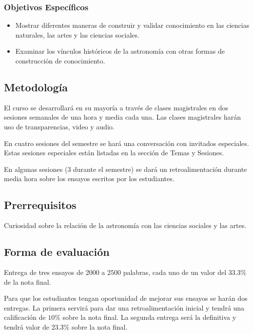 \documentclass[12pt]{report}
\begin{document}
\subsubsection*{Objetivos Espec\'ificos}
\begin{itemize}
\item Mostrar diferentes maneras de construir y validar conocimiento
  en las ciencias naturales, las artes y las ciencias sociales.     

\item Examinar los v\'inculos hist\'oricos de la
  astronom\'ia con otras formas de construcci\'on de conocimiento. 
\end{itemize}

\subsection*{Metodolog\'ia}

El curso se desarrollar\'a en su mayor\'ia a trav\'es de clases
magistrales en dos sesiones semanales de una hora y media cada
una. 
Las clases magistrales har\'an uso de transparencias, video y
audio. 

En cuatro sesiones del semestre se har\'a una conversaci\'on con
invitados especiales. 
Estas sesiones especiales est\'an listadas en la
secci\'on de Temas y Sesiones.  

En algunas sesiones (3 durante el semestre) se dar\'a un
retroalimentaci\'on durante media hora sobre los ensayos escritos por
los estudiantes.  

\subsection*{Prerrequisitos}
Curiosidad sobre la relaci\'on de la astronom\'ia con las ciencias
sociales y las artes.

\subsection*{Forma de evaluaci\'on}

Entrega de tres ensayos de 2000 a 2500 palabras,
cada uno de un valor del $33.3\%$ de la nota final.

Para que los estudiantes tengan oportunidad de mejorar sus ensayos se
har\'an dos entregas. La primera servir\'a para dar una
retroalimentaci\'on inicial y tendr\'a una calificaci\'on de $10\%$
sobre la nota final. La segunda entrega ser\'a la definitiva y
tendr\'a  valor de $23.3\%$ sobre la nota final. 
 
\end{document}
